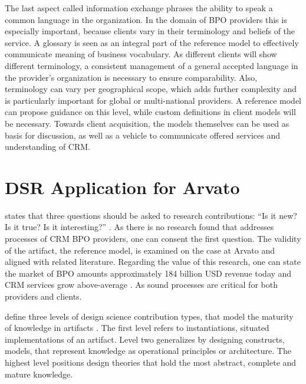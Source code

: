 The last aspect called information exchange phrases the ability to speak a common language in the organization. In the domain of BPO providers this is especially important, because clients vary in their terminology and beliefs of the service. A glossary is seen as an integral part of the reference model to effectively communicate meaning of business vocabulary. As different clients will show different terminology, a consistent management of a general accepted language in the provider’s organization is necessary to ensure comparability. Also, terminology can vary per geographical scope, which adds further complexity and is particularly important for global or multi-national providers. A reference model can propose guidance on this level, while custom definitions in client models will be necessary. Towards client acquisition, the models themselves can be used as basis for discussion, as well as a vehicle to communicate offered services and understanding of CRM.


%

\section{DSR Application for Arvato}

 \citeauthor{wilson2002responsible} states that three questions should be asked to research contributions: \enquote{Is it new? Is it true? Is it interesting?} \citep[]{wilson2002responsible}. As there is no research found that addresses processes of CRM BPO providers, one can consent the first question. The validity of the artifact, \viz the reference model, is examined on the case at Arvato and aligned with related literature. Regarding the value of this research, one can state the market of BPO amounts approximately 184 billion USD revenue today and CRM services grow above-average \citep{hfs2016top}. As sound processes are critical for both providers and clients. 

\citeauthor{gregor2013positioning} define three levels of design science contribution types, that model the maturity of knowledge in artifacts \citep{gregor2013positioning}. The first level refers to instantiations, \ie situated implementations of an artifact. Level two generalizes by designing constructs, models, that represent knowledge as operational principles or architecture. The highest level positions design theories that hold the most abstract, complete and mature knowledge. 

